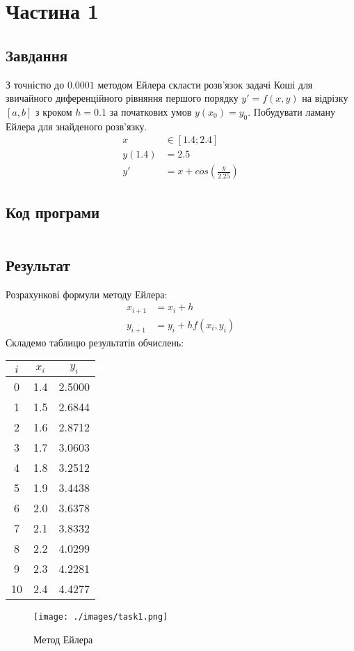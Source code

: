 \section{Частина 1}
\label{sec:task1}

\subsection{Завдання}
\label{subsec:task1_task}

З точністю до $0.0001$ методом Ейлера скласти розв'язок задачі Коші
для звичайного диференційного рівняння першого порядку
$y' = f(x, y)$ на відрізку $[a, b]$ з кроком $h = 0.1$
за початкових умов $y(x_0) = y_0$.
Побудувати ламану Ейлера для знайденого розв'язку.
\begin{align}
    x      & \in [1.4; 2.4]            \\
    y(1.4) & = 2.5                     \\
    y'     & = x + cos(\frac{y}{2.25})
\end{align}

\subsection{Код програми}
\label{subsec:task1_code}
\inputminted{python}{../src/task1.py}

\subsection{Результат}
\label{subsec:task1_result}

Розрахункові формули методу Ейлера:
\begin{align}
    x_{i + 1} & = x_i + h             \\
    y_{i + 1} & = y_i + h f(x_i, y_i)
\end{align}
Складемо таблицю результатів обчислень:

\begin{tabular}{|c|c|c|}
    \toprule
    $i$ & $x_i$ & $y_i$  \\

    \midrule
    0   & 1.4   & 2.5000 \\
    \hline
    1   & 1.5   & 2.6844 \\
    \hline
    2   & 1.6   & 2.8712 \\
    \hline
    3   & 1.7   & 3.0603 \\
    \hline
    4   & 1.8   & 3.2512 \\
    \hline
    5   & 1.9   & 3.4438 \\
    \hline
    6   & 2.0   & 3.6378 \\
    \hline
    7   & 2.1   & 3.8332 \\
    \hline
    8   & 2.2   & 4.0299 \\
    \hline
    9   & 2.3   & 4.2281 \\
    \hline
    10  & 2.4   & 4.4277 \\

    \bottomrule
\end{tabular}

\begin{figure}[!ht]
    \centering
    \texttt{[image: ./images/task1.png]}
    \caption{Метод Ейлера}
    \label{fig:euler}
\end{figure}
